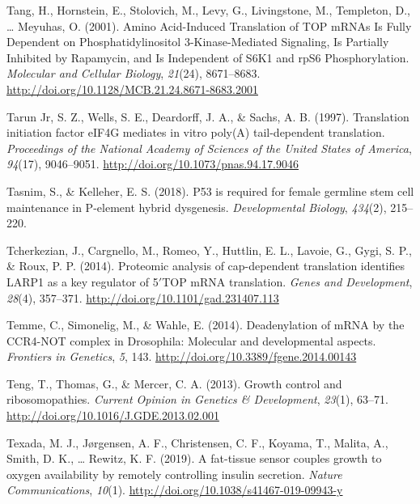 \documentclass[12pt,twoside]{reedthesis}
\newlength{\cslhangindent}
\newenvironment{cslreferences}%
  {\setlength{\parindent}{0pt}%
  \everypar{\setlength{\hangindent}{\cslhangindent}}\ignorespaces}%
  {\par}
\begin{document}
\begin{cslreferences}
\leavevmode\hypertarget{ref-tangAminoAcidInducedTranslation2001}{}%
Tang, H., Hornstein, E., Stolovich, M., Levy, G., Livingstone, M., Templeton, D., \ldots{} Meyuhas, O. (2001). Amino Acid-Induced Translation of TOP mRNAs Is Fully Dependent on Phosphatidylinositol 3-Kinase-Mediated Signaling, Is Partially Inhibited by Rapamycin, and Is Independent of S6K1 and rpS6 Phosphorylation. \emph{Molecular and Cellular Biology}, \emph{21}(24), 8671--8683. \url{http://doi.org/10.1128/MCB.21.24.8671-8683.2001}

\leavevmode\hypertarget{ref-TarunJr1997l}{}%
Tarun Jr, S. Z., Wells, S. E., Deardorff, J. A., \& Sachs, A. B. (1997). Translation initiation factor eIF4G mediates in vitro poly(A) tail-dependent translation. \emph{Proceedings of the National Academy of Sciences of the United States of America}, \emph{94}(17), 9046--9051. \url{http://doi.org/10.1073/pnas.94.17.9046}

\leavevmode\hypertarget{ref-Tasnim2018a}{}%
Tasnim, S., \& Kelleher, E. S. (2018). P53 is required for female germline stem cell maintenance in P-element hybrid dysgenesis. \emph{Developmental Biology}, \emph{434}(2), 215--220.

\leavevmode\hypertarget{ref-Tcherkezian2014b}{}%
Tcherkezian, J., Cargnello, M., Romeo, Y., Huttlin, E. L., Lavoie, G., Gygi, S. P., \& Roux, P. P. (2014). Proteomic analysis of cap-dependent translation identifies LARP1 as a key regulator of 5\({'}\)TOP mRNA translation. \emph{Genes and Development}, \emph{28}(4), 357--371. \url{http://doi.org/10.1101/gad.231407.113}

\leavevmode\hypertarget{ref-Temme2014j}{}%
Temme, C., Simonelig, M., \& Wahle, E. (2014). Deadenylation of mRNA by the CCR4-NOT complex in Drosophila: Molecular and developmental aspects. \emph{Frontiers in Genetics}, \emph{5}, 143. \url{http://doi.org/10.3389/fgene.2014.00143}

\leavevmode\hypertarget{ref-Teng2013}{}%
Teng, T., Thomas, G., \& Mercer, C. A. (2013). Growth control and ribosomopathies. \emph{Current Opinion in Genetics \& Development}, \emph{23}(1), 63--71. \url{http://doi.org/10.1016/J.GDE.2013.02.001}

\leavevmode\hypertarget{ref-Texada2019}{}%
Texada, M. J., Jørgensen, A. F., Christensen, C. F., Koyama, T., Malita, A., Smith, D. K., \ldots{} Rewitz, K. F. (2019). A fat-tissue sensor couples growth to oxygen availability by remotely controlling insulin secretion. \emph{Nature Communications}, \emph{10}(1). \url{http://doi.org/10.1038/s41467-019-09943-y}


\end{cslreferences}
\end{document}
